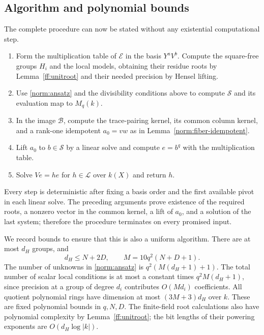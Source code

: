 \subsection{Algorithm and polynomial bounds}

The complete procedure can now be stated without any existential
computational step.

\begin{enumerate}
\item Form the multiplication table of $\mathcal E$ in the basis
      $Y^aV^b$.  Compute the square-free groups $H_i$ and the local
      models, obtaining their residue roots by
      Lemma~\ref{ff:unitroot} and their needed precision by Hensel
      lifting.
\item Use \eqref{norm:ansatz} and the divisibility conditions above
      to compute $\mathcal S$ and its evaluation map to $M_q(k)$.
\item In the image $\mathcal B$, compute the trace-pairing kernel,
      its common column kernel, and a rank-one idempotent $a_0=vw$
      as in Lemma~\ref{norm:fiber-idempotent}.
\item Lift $a_0$ to $b\in\mathcal S$ by a linear solve and compute
      $e=b^q$ with the multiplication table.
\item Solve $Ve=he$ for $h\in \mathcal L$ over $k(X)$ and return $h$.
\end{enumerate}

Every step is deterministic after fixing a basis order and the first
available pivot in each linear solve.  The preceding arguments prove
existence of the required roots, a nonzero vector in the common
kernel, a lift of $a_0$, and a solution of the last system; therefore
the procedure terminates on every promised input.

We record bounds to ensure that this is also a uniform algorithm.
There are at most $d_H$ groups, and
\[
 d_H\le N+2D,\qquad M=10q^2(N+D+1).
\]
The number of unknowns in \eqref{norm:ansatz} is
$q^2(M(d_H+1)+1)$.  The total number of scalar local conditions is at
most a constant times $q^2M(d_H+1)$, since precision at a group of
degree $d_i$ contributes $O(Md_i)$ coefficients.  All quotient
polynomial rings have dimension at most $(3M+3)d_H$ over $k$.
These are fixed polynomial bounds in $q,N,D$.  The finite-field root
calculations also have polynomial complexity by
Lemma~\ref{ff:unitroot}; the bit lengths of their powering exponents
are $O(d_H\log|k|)$.

